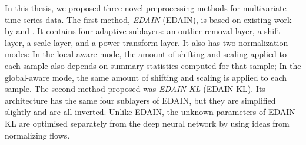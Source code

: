 \documentclass{statsmsc}
\begin{document}
{%
In this thesis, we proposed three novel preprocessing methods for multivariate time-series data.
The first method, \textit{\acl{EDAIN}} (\acs{EDAIN}), is based on existing work by \cite{dain} and
\cite{bin}. It contains four adaptive sublayers: an outlier removal layer, a shift layer,
a scale layer, and a power transform layer. It also has two normalization modes: In the local-aware
mode, the amount of shifting and scaling applied to each sample also depends on summary
statistics computed for that sample; In the global-aware mode, the same amount
of shifting and scaling is applied to each sample. 
The second method proposed was \textit{\acl{EDAIN-KL}} (\acs{EDAIN-KL}).
Its architecture has the same four sublayers of
\ac{EDAIN}, but they are simplified slightly and are all inverted. Unlike \ac{EDAIN}, the
unknown parameters of \ac{EDAIN-KL} are optimised separately from the deep neural network by
using ideas from normalizing flows. %
}
\end{document}
